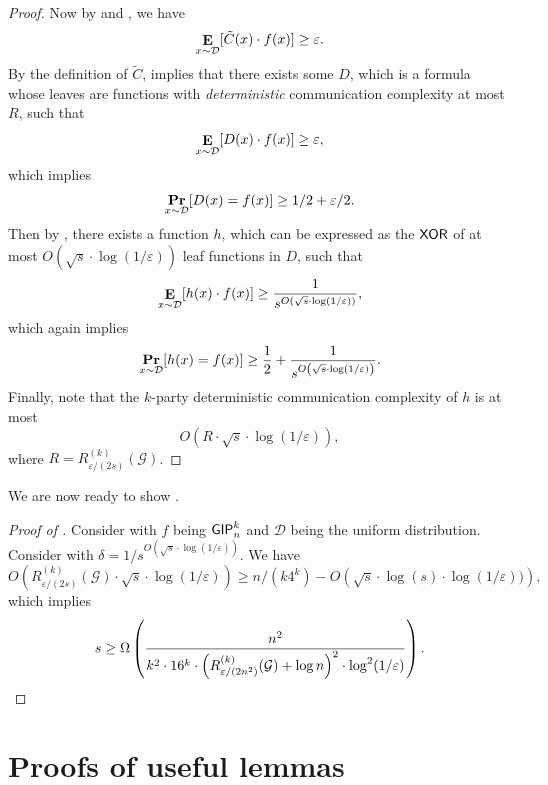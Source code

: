 \documentclass[10pt,a4paper]{article}
\DeclareMathOperator*\Exp{{\bf E}}
\DeclareMathOperator*\Prob{{\bf Pr}}
\newcommand{\XOR}{{\sf XOR}}
\newcommand{\GIP}{{\sf GIP}}
\begin{document}
\begin{proof}
        Now by  and , we have
        \begin{equation}\label{eq:lb-eq-1}
	        \Exp_{x\sim\mathcal{D}}[\tilde{C}(x)\cdot f(x)]\geq \varepsilon.
        \end{equation}
        By the definition of $\tilde{C}$,  implies that there exists some $D$, which is a formula whose leaves are functions with \emph{deterministic} communication complexity at most $R$, such that
        \[
            \Exp_{x\sim\mathcal{D}}[D(x)\cdot f(x)]\geq \varepsilon,
        \]
        which implies
        \[
            \Prob_{x\sim\mathcal{D}}[D(x)=f(x)]\geq 1/2+ \varepsilon/2.
        \]
        Then by , there exists a function $h$, which can be expressed as the $\XOR$ of at most $O(\sqrt{s}\cdot\log(1/\varepsilon))$ leaf functions in $D$, such that
        \[
            \Exp_{x\sim\mathcal{D}}[h(x)\cdot f(x)]\geq \frac{1}{s^{O(\sqrt{s}\cdot\log(1/\varepsilon))}},
        \]
        which again implies
        \[
            \Prob_{x\sim\mathcal{D}}[h(x)=f(x)]\geq \frac{1}{2} + \frac{1}{s^{O\left(\sqrt{s}\cdot\log(1/\varepsilon)\right)}}.
        \]
        Finally, note that the $k$-party deterministic communication complexity of $h$ is at most 
        \[
            O(R\cdot\sqrt{s}\cdot\log(1/\varepsilon)),
        \]
        where $R=R^{(k)}_{\varepsilon/(2s)}(\mathcal{G})$.
    \end{proof}
    
    We are now ready to show .
    
    \begin{proof}[Proof of ]
        Consider  with $f$ being $\GIP_{n}^{k}$ and $\mathcal{D}$ being the uniform distribution. Consider  with $\delta=1/s^{O(\sqrt{s}\cdot\log(1/\varepsilon))}$. We have
        \[
            O\left(R^{(k)}_{\varepsilon/(2s)}(\mathcal{G})\cdot\sqrt{s}\cdot\log(1/\varepsilon)\right)\geq n/(k4^k) - O\left(\sqrt{s}\cdot\log(s)\cdot\log(1/\varepsilon))\right),
        \]
        which implies
        \[
            s\geq \Omega\left( \frac{n^2}{k^2\cdot 16^{k}\cdot\left(R^{(k)}_{\varepsilon/(2n^2)}(\mathcal{G})+\log n\right)^2\cdot\log^2(1/\varepsilon)}\right).\qedhere
        \]
    \end{proof}
	

\appendix
\setcounter{theorem}{49}
    \section{Proofs of useful lemmas}
    
\end{document}
